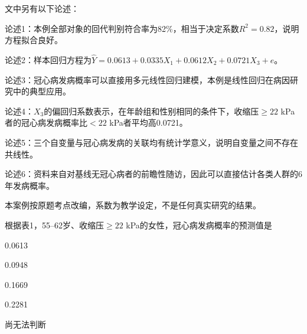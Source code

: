 文中另有以下论述：

论述1：本例全部对象的回代判别符合率为82\%，相当于决定系数\(R^2=0.82\)，说明方程拟合良好。

论述2：样本回归方程为\(\hat Y=0.0613+0.0335X_1+0.0612X_2+0.0721X_3+e\)。

论述3：冠心病发病概率可以直接用多元线性回归建模，本例是线性回归在病因研究中的典型应用。

论述4：\(X_3\)的偏回归系数表示，在年龄组和性别相同的条件下，收缩压\(\ge22\) kPa者的冠心病发病概率比\(<22\) kPa者平均高0.0721。

论述5：三个自变量与冠心病发病的关联均有统计学意义，说明自变量之间不存在共线性。

论述6：资料来自对基线无冠心病者的前瞻性随访，因此可以直接估计各类人群的6年发病概率。

本案例按原题考点改编，系数为教学设定，不是任何真实研究的结果。

\par\addvspace{6pt}\noindent\begin{minipage}{\linewidth}


根据表1，55--62岁、收缩压\(\ge22\) kPa的女性，冠心病发病概率的预测值是

\begin{choices}

\item 0.0613

\item 0.0948

\item 0.1669

\item 0.2281

\item 尚无法判断

\end{choices}

\end{minipage}\par\vspace{4pt}

